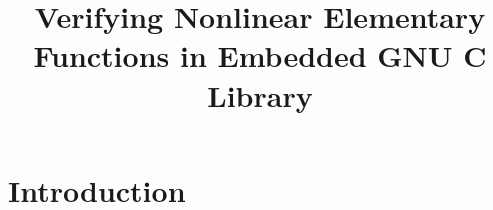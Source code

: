 \documentclass{acm_proc_article-sp}
\begin{document}
\title{Verifying Nonlinear Elementary Functions in Embedded GNU C
  Library}

\maketitle
\begin{abstract}
\end{abstract}


\section{Introduction}
\end{document}

